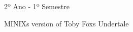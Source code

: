 2º Ano -\/ 1º Semestre

M\+I\+N\+IX\textquotesingle{}s version of Toby Fox\textquotesingle{}s Undertale 